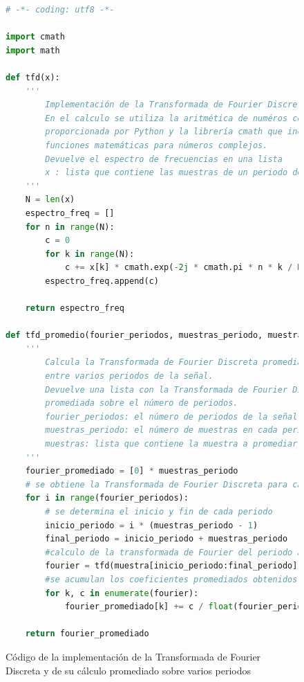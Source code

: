 \documentclass[11pt]{article}
\begin{document}
\begin{figure}
\begin{lstlisting}[language=Python]
# -*- coding: utf8 -*-

import cmath
import math

def tfd(x):
	'''
		Implementación de la Transformada de Fourier Discreta.
		En el calculo se utiliza la aritmética de numéros complejos
		proporcionada por Python y la librería cmath que incluye otras
		funciones matemáticas para números complejos.
		Devuelve el espectro de frecuencias en una lista
		x : lista que contiene las muestras de un periodo de la señal
	'''
	N = len(x)
	espectro_freq = []
	for n in range(N):
		c = 0
		for k in range(N):
			c += x[k] * cmath.exp(-2j * cmath.pi * n * k / N)
		espectro_freq.append(c)

	return espectro_freq 

def tfd_promedio(fourier_periodos, muestras_periodo, muestra):
	'''
		Calcula la Transformada de Fourier Discreta promediada
		entre varios periodos de la señal.
		Devuelve una lista con la Transformada de Fourier Discreta
		promediada sobre el número de periodos.
		fourier_periodos: el número de periodos de la señal
		muestras_periodo: el número de muestras en cada periodo
		muestras: lista que contiene la muestra a promediar
	'''
	fourier_promediado = [0] * muestras_periodo
	# se obtiene la Transformada de Fourier Discreta para cada periodo
	for i in range(fourier_periodos):
		# se determina el inicio y fin de cada periodo
		inicio_periodo = i * (muestras_periodo - 1)
		final_periodo = inicio_periodo + muestras_periodo
		#calculo de la transformada de Fourier del periodo actual
		fourier = tfd(muestra[inicio_periodo:final_periodo])
		#se acumulan los coeficientes promediados obtenidos por cada periodo
		for k, c in enumerate(fourier):
			fourier_promediado[k] += c / float(fourier_periodos)

	return fourier_promediado
\end{lstlisting}
\caption{Código de la implementación de la Transformada de Fourier Discreta y de su cálculo promediado sobre varios periodos}
\end{figure}
\end{document}
